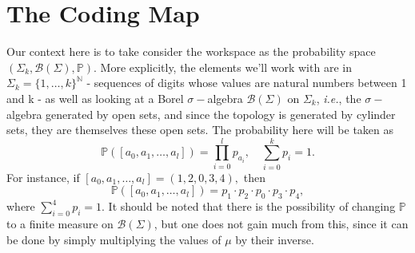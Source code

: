 \documentclass{article}
\begin{document}
\section{The Coding Map}
Our context here is to take consider the workspace as the probability space \((\Sigma_{k} , \mathcal{B}(\Sigma ), \mathbb{P})\). More explicitly,
the elements we'll work with are in \(\Sigma_{k} = \{1,\dotsc , k\}^{\mathbb{N}}\) - sequences of digits whose values are natural numbers between 1 and k -
as well as looking at a Borel \(\sigma-\)algebra \(\mathcal{B}(\Sigma )\) on \(\Sigma_{k} \), \textit{i.e.}, the \(\sigma-\)algebra generated by open sets,
and since the topology is generated by cylinder sets, they are themselves these open sets. The probability here will be taken as
\[
	\mathbb{P}([a_{0}, a_{1}, \dotsc , a_{l}]) = \prod\limits_{i=0}^{l}p_{a_{i}},\quad \sum\limits_{i=0}^{k}p_{i}=1.
\]
For instance, if \([a_{0}, a_{1}, \dotsc , a_{l}] = (1,2,0,3,4),\) then
\[
	\mathbb{P}([a_{0}, a_{1}, \dotsc , a_{l}]) = p_{1}\cdot p_{2}\cdot p_{0}\cdot p_{3}\cdot p_{4},
\]
where \(\sum\limits_{i=0}^{4}p_{i} = 1\). It should be noted that there is the possibility of changing \(\mathbb{P}\) to a finite measure on \(\mathcal{B}(\Sigma )\),
but one does not gain much from this, since it can be done by simply multiplying the values of \(\mu \) by their inverse.
\end{document}
